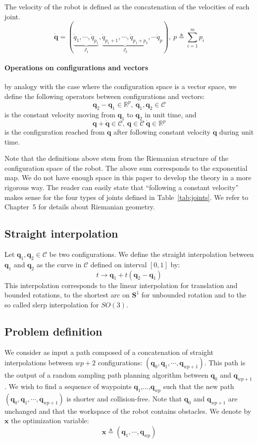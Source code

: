 \documentclass{tADR2e}
\newcommand\real{\mathbb{R}}
\newcommand\CS{\mathcal{C}}
\newcommand\Sone{\mathbf{S}^1}
\newcommand\conf{\mathbf{q}}
\newcommand\xx{\mathbf{x}}
\begin{document}
The velocity of the robot is defined as the concatenation of the velocities of 
each joint.
$$\dot{\conf} = (\underbrace{\dot{q}_{1},\cdots,\dot{q}_{p_1}}_{J_1},
\underbrace{\dot{q}_{p_1+1},\cdots,\dot{q}_{p_1+p_2}}_{J_2},\cdots \dot{q}_p),\ p
\triangleq\sum_{i=1}^m p_i$$

\paragraph {Operations on configurations and vectors} by analogy with the case 
where the configuration space is a vector space, we define the following 
operators between configurations and vectors:
$$
\conf_2 - \conf_1 \in \real^p, \ \conf_1, \conf_2\in\CS
$$
is the constant velocity moving from $\conf_1$ to $\conf_2$ in unit time, and
$$
\conf + \dot{\conf}\in\CS, \ \conf\in\CS \ \dot{\conf}\in\real^p
$$
is the configuration reached from $\conf$ after following constant velocity $
\dot{\conf}$ during unit time.

Note that the definitions above stem from the Riemanian structure of the 
configuration space of the robot. The above sum corresponds to the exponential 
map. We do not have enough space in this paper to develop the theory in a more 
rigorous way. The reader can easily state that ``following a 
constant velocity'' makes sense for the four types of joints defined in 
Table~\ref{tab:joints}. We refer to~\cite{riemanian-optim2008} Chapter~5 for 
details about Riemanian geometry.

\subsection {Straight interpolation}

Let $\conf_1, \conf_2\in\CS$ be two configurations. We define the straight 
interpolation between $\conf_1$ and $\conf_2$ as the curve in $\CS$ defined on 
interval $[0,1]$ by:
$$
t \rightarrow \conf_1 + t (\conf_2 - \conf_1)
$$
This interpolation corresponds to the linear interpolation for translation and 
bounded rotations, to the shortest arc on $\Sone$ for unbounded rotation and to 
the so called slerp interpolation for $SO(3)$.

\subsection{Problem definition}

We consider as input a path composed of a concatenation of straight 
interpolations between $wp+2$ configurations: $(\conf_0, \conf_1,\cdots,\conf_{wp
+1})$. This path is the output of a random sampling path planning algorithm 
between $\conf_0$ and $\conf_{wp+1}$. We wish to find a sequence of waypoints $
\conf_{1}$,...,$\conf_{wp}$ such that the new path $(\conf_0, \conf_1,\cdots,
\conf_{wp+1})$ is shorter and collision-free. Note that $\conf_0$ and $\conf_{wp
+1}$ are unchanged and that the workspace of the robot contains obstacles. We 
denote by $\xx$ the optimization variable:
$$
\xx \triangleq (\conf_1,\cdots,\conf_{wp})
$$
\end{document}

